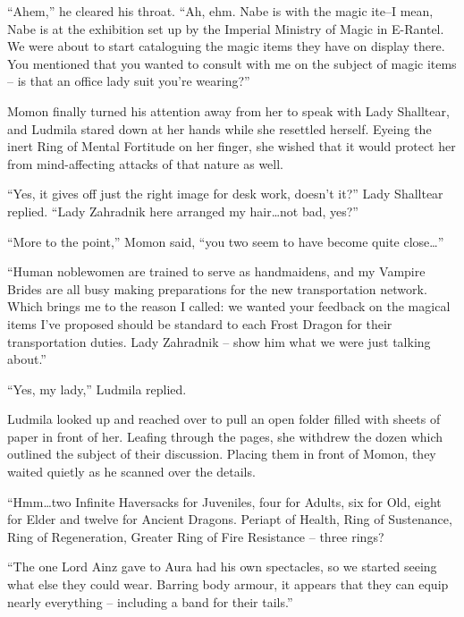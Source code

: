 “Ahem,” he cleared his throat. “Ah, ehm. Nabe is with the magic ite–I mean, Nabe is at the exhibition set up by the Imperial Ministry of Magic in E-Rantel. We were about to start cataloguing the magic items they have on display there. You mentioned that you wanted to consult with me on the subject of magic items – is that an office lady suit you’re wearing?”

 

Momon finally turned his attention away from her to speak with Lady Shalltear, and Ludmila stared down at her hands while she resettled herself. Eyeing the inert Ring of Mental Fortitude on her finger, she wished that it would protect her from mind-affecting attacks of that nature as well.

 

“Yes, it gives off just the right image for desk work, doesn’t it?” Lady Shalltear replied. “Lady Zahradnik here arranged my hair…not bad, yes?”

 

“More to the point,” Momon said, “you two seem to have become quite close…”

 

“Human noblewomen are trained to serve as handmaidens, and my Vampire Brides are all busy making preparations for the new transportation network. Which brings me to the reason I called: we wanted your feedback on the magical items I’ve proposed should be standard to each Frost Dragon for their transportation duties. Lady Zahradnik – show him what we were just talking about.”

 

“Yes, my lady,” Ludmila replied.

 

Ludmila looked up and reached over to pull an open folder filled with sheets of paper in front of her. Leafing through the pages, she withdrew the dozen which outlined the subject of their discussion. Placing them in front of Momon, they waited quietly as he scanned over the details.

 

“Hmm…two Infinite Haversacks for Juveniles, four for Adults, six for Old, eight for Elder and twelve for Ancient Dragons. Periapt of Health, Ring of Sustenance, Ring of Regeneration, Greater Ring of Fire Resistance – three rings?

 

“The one Lord Ainz gave to Aura had his own spectacles, so we started seeing what else they could wear. Barring body armour, it appears that they can equip nearly everything – including a band for their tails.”

